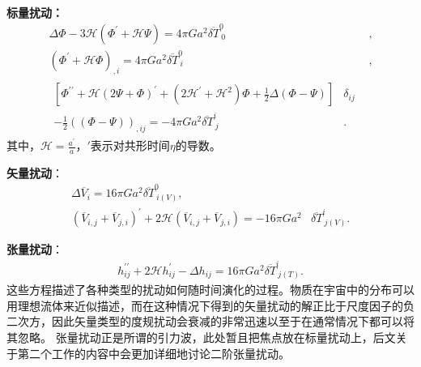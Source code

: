\textbf{标量扰动：}
\begin{align}
  \Delta\Phi-3\mathcal{H}{\left(\Phi^\prime+\mathcal{H}\Psi\right)} =
  4\pi Ga^2\overline{\delta T}^{0}_{\ 0}&, 
  \label{eq:equation-gauge-scalar-perturbation1}\\
  {\left(\Phi^\prime+\mathcal{H}\Phi\right)}_{,i}=4\pi
  Ga^2\overline{\delta T}^{0}_{\ i}&,
  \label{eq:equation-gauge-scalar-perturbation2}\\
  \begin{split}
    {\left[\Phi^{\prime\prime}+\mathcal{H}{\left(2\Psi+\Phi\right)}^{\prime}+(2\mathcal{H^\prime}+\mathcal{H}^2)\Phi 
+\frac{1}{2}\Delta(\Phi-\Psi)\right]}&\delta_{ij} \\
    -\frac{1}{2}{\left((\Phi-\Psi)\right)}_{,ij} = -4\pi
Ga^2\overline{\delta T}^{i}_{\ j}&.
  \end{split}
  \label{eq:equation-gauge-scalar-perturbation3}
\end{align}
其中，$\mathcal{H}=\frac{a^\prime}{a}$，$\prime$表示对共形时间$\eta$的导数。

\textbf{矢量扰动}：
\begin{align}
  \label{eq:equation-gauge-vector-perturbation}
  \Delta\overline{V}_{i}=16\pi Ga^2\overline{\delta T}^{0}_{\ i(V)}, \\  
  {\left(\overline{V}_{i,j}+\overline{V}_{j,i}\right)}^{\prime} + 
  2\mathcal{H}{\left(\overline{V}_{i,j}+\overline{V}_{j,i}\right)} = 
  -16\pi Ga^2&\overline{\delta T}^{i}_{\ j(V)}.
\end{align}

\textbf{张量扰动}：
\begin{align}
  \label{eq:equation-gauge-tensor-perturbation}
  h^{\prime\prime}_{ij}+2\mathcal{H}h^\prime_{ij}-\Delta h_{ij}=16\pi
  Ga^2\overline{\delta T}^{i}_{\ j(T)}.
\end{align}
这些方程描述了各种类型的扰动如何随时间演化的过程。物质在宇宙中的分布可以用理想流体来近似描述，而在这种情况下得到的矢量扰动的解正比于尺度因子的负二次方，因此矢量类型的度规扰动会衰减的非常迅速以至于在通常情况下都可以将其忽略。
张量扰动正是所谓的引力波，此处暂且把焦点放在标量扰动上，后文关于第二个工作的内容中会更加详细地讨论二阶张量扰动。

